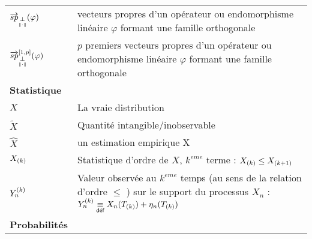 \begin{table}[H]
\begin{tabularx}{\textwidth}{lX}
	$\overrightarrow{sp}_{\orthonormal}(\varphi)$                    & vecteurs propres d'un opérateur ou endomorphisme linéaire $\varphi$ formant une famille orthogonale                                                                                                        \\
	$\overrightarrow{sp}_{\orthonormal}^{[1,p]}(\varphi)$            & $p$ premiers vecteurs propres d'un opérateur ou endomorphisme linéaire $\varphi$ formant une famille orthogonale                                                                                           \\
	\midrule
	\textbf{Statistique}                                             &                                                                                                                                                                                                            \\
	\midrule
	$X$                                                              & La \og vraie \fg distribution                                                                                                                                                                              \\
	$\widetilde{X}$                                                  & Quantité intangible/inobservable                                                                                                                                                                           \\
	$\widehat{X}$                                                    & un estimation empirique X                                                                                                                                                                                  \\
	$\ordered X k$                                                   & Statistique d'ordre de $X$, $k^{eme}$ terme : $\ordered X {k} \leq \ordered X {k+1}$                                                                                                                       \\
	$\statrang Y n {k}$                                              & Valeur observée au $k^{eme}$ temps (au sens de la relation d'ordre $\leq$ ) sur le support du processus $X_n$ : $\statrang Y n k \isdef X_n( \ordered T k ) + \eta_n( \ordered T k )$                      \\
	\midrule
	\textbf{Probabilités}                                            &                                                                                                                                                                                                            \\

\end{tabularx}
\end{table}
